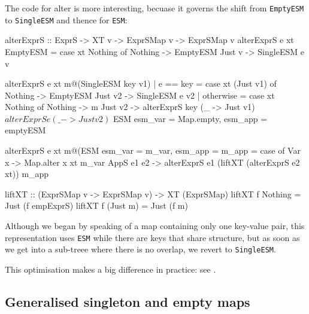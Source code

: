 \documentclass[acmsmall]{acmart}
\theoremstyle{theorem}
\theoremstyle{definition}
\theoremstyle{remark}
\begin{document}
The code for alter is more interesting, becuase it governs the shift from
\lstinline{EmptyESM} to \lstinline{SingleESM} and thence for \lstinline{ESM}:
\begin{code}
alterExprS  :: ExprS -> XT v -> ExprSMap v -> ExprSMap v
alterExprS e xt EmptyESM
  = case xt Nothing of
      Nothing -> EmptyESM
      Just v  -> SingleESM e v

alterExprS e xt m@(SingleESM key v1)
  | e == key
  = case xt (Just v1) of
      Nothing -> EmptyESM
      Just v2  -> SingleESM e v2
  | otherwise
  = case xt Nothing of
      Nothing -> m
      Just v2 -> alterExprS key (\_ -> Just v1) $
                 alterExprS e   (\_ -> Just v2) $
                 ESM { esm_var = Map.empty, esm_app = emptyESM }

alterExprS e xt m@(ESM { esm_var = m_var, esm_app = m_app }
  = case of
      Var x      -> Map.alter x xt m_var
      AppS e1 e2 -> alterExprS e1 (liftXT (alterExprS e2 xt)) m_app

liftXT :: (ExprSMap v -> ExprSMap v) -> XT (ExprSMap)
liftXT f Nothing  = Just (f empExprS)
liftXT f (Just m) = Just (f m)
\end{code}
Although we began by speaking of a map containing only one key-value pair,
this representation uses \lstinline{ESM} while there are keys that share structure,
but as soon as we get into a sub-treee where there is no overlap, we revert
to \lstinline{SingleESM}.

This optimisation makes a big difference in practice: see .

\subsection{Generalised singleton and empty maps} \label{sec:generalised}
\end{document}
